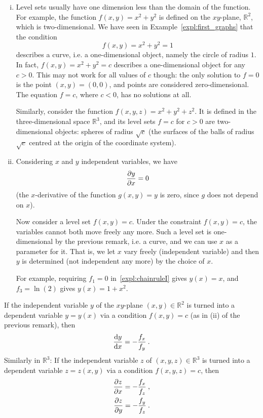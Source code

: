 \begin{remark}
\begin{enumerate}[(i)]
	\item Level sets usually have one dimension less than the domain of the function. For example, the function $f(x,y) = x^2 + y^2$ is defined on the $xy$-plane, $\mathbb{R}^2$, which is two-dimensional. We have seen in Example~\ref{expl:first_graphs} that the condition
	\[ f(x,y) = x^2 + y^2 = 1 \]
	describes a curve, i.e. a one-dimensional object, namely the circle of radius $1$. In fact, $f(x,y)=x^2+y^2=c$ describes a one-dimensional object for any $c>0$. This may not work for all values of $c$ though: the only solution to $f=0$ is the point $(x,y)=(0,0)$, and points are considered zero-dimensional. The equation $f=c$, where $c<0$, has no solutions at all.
	
	Similarly, consider the function $f(x,y,z) = x^2 + y^2 + z^2$. It is defined in the three-dimensional space $\mathbb{R}^3$, and its level sets $f=c$ for $c>0$ are two-dimensional objects: spheres of radius $\sqrt{c}$ (the surfaces of the balls of radius $\sqrt{c}$ centred at the origin of the coordinate system).
	\item Considering $x$ and $y$ independent variables, we have
	\[ \displaystyle{\frac{\partial y}{\partial x}} = 0 \]
	(the $x$-derivative of the function $g(x,y)=y$ is zero, since $g$ does not depend on $x$). 
	
	Now consider a level set $f(x,y)=c$. Under the constraint $f(x,y)=c$, the variables cannot both move freely any more. Such a level set is one-dimensional by the previous remark, i.e. a curve, and we can use $x$ as a parameter for it. That is, we let $x$ vary freely (independent variable) and then $y$ is determined (not independent any more) by the choice of $x$.
	
	For example, requiring $f_1 = 0$ in~\ref{expl:chainruleI} gives $y(x) = x$, and $f_3=\ln(2)$ gives $y(x)=1+x^2$.
\end{enumerate}
\end{remark}

\begin{theorem}
\label{thm:impl_diff}
If the independent variable $y$ of the $xy$-plane $(x,y)\in\mathbb{R}^2$ is turned into a dependent variable $y=y(x)$ via a condition $f(x,y)=c$ (as in (ii) of the previous remark), then
\[ \displaystyle{\frac{\mathrm{d}y}{\mathrm{d}x}} = -\frac{f_x}{f_y} \:. \]
Similarly in $\mathbb{R}^3$: If the independent variable $z$ of $(x,y,z)\in\mathbb{R}^3$ is turned into a dependent variable $z=z(x,y)$ via a condition $f(x,y,z)=c$, then
\begin{equation*}
\begin{split}
\displaystyle{\frac{\partial z}{\partial x}} = -\frac{f_x}{f_z} \:, \\
\displaystyle{\frac{\partial z}{\partial y}} = -\frac{f_y}{f_z} \:. 
\end{split}
\end{equation*}
\end{theorem}

